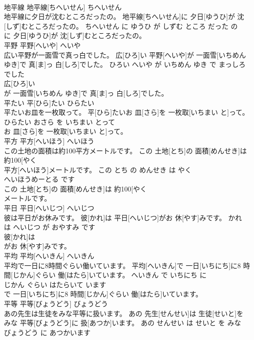 \documentclass[8pt]{extreport}
\begin{document}
\begin{CJK}{UTF8}{min}
\\	地平線	地平線[ちへいせん]	ちへいせん	
\\	地平線に夕日が沈むところだったの。	地平線[ちへいせん]に 夕日[ゆうひ]が 沈[しず]むところだったの。	ちへいせん に ゆうひ が しずむ ところ だった の	
\\	に 夕日[ゆうひ]が 沈[しず]むところだったの。			
\\	平野	平野[へいや]	へいや	
\\	広い平野が一面雪で真っ白でした。	広[ひろ]い 平野[へいや]が 一面雪[いちめん ゆき]で 真[ま]っ 白[しろ]でした。	ひろい へいや が いちめん ゆき で まっしろ でした	
\\	広[ひろ]い
\\	が 一面雪[いちめん ゆき]で 真[ま]っ 白[しろ]でした。			
\\	平たい	平[ひら]たい	ひらたい	
\\	平たいお皿を一枚取って。	平[ひら]たいお 皿[さら]を 一枚取[いちまい と]って。	ひらたい おさら を いちまい とって	
\\	お 皿[さら]を 一枚取[いちまい と]って。			
\\	平方	平方[へいほう]	へいほう	
\\	この土地の面積は約100平方メートルです。	この 土地[とち]の 面積[めんせき]は 約100[やく 
\\	平方[へいほう]メートルです。	この とち の めんせき は やく 
\\	へいほうめーとる です	
\\	この 土地[とち]の 面積[めんせき]は 約100[やく 
\\	メートルです。			
\\	平日	平日[へいじつ]	へいじつ	
\\	彼は平日がお休みです。	彼[かれ]は 平日[へいじつ]がお 休[やす]みです。	かれ は へいじつ が おやすみ です	
\\	彼[かれ]は
\\	がお 休[やす]みです。			
\\	平均	平均[へいきん]	へいきん	
\\	平均で一日に8時間ぐらい働いています。	平均[へいきん]で 一日[いちにち]に8 時間[じかん]ぐらい 働[はたら]いています。	へいきん で いちにち に 
\\	じかん ぐらい はたらいて います	
\\	で 一日[いちにち]に8 時間[じかん]ぐらい 働[はたら]いています。			
\\	平等	平等[びょうどう]	びょうどう	
\\	あの先生は生徒をみな平等に扱います。	あの 先生[せんせい]は 生徒[せいと]をみな 平等[びょうどう]に 扱[あつか]います。	あの せんせい は せいと を みな びょうどう に あつかいます	

\end{CJK}
\end{document}
